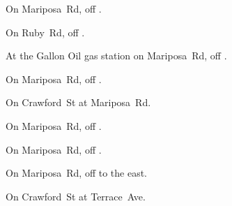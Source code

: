 
\begin{LocationList}

On Mariposa~Rd, off  .

On Ruby~Rd, off  .

At the Gallon Oil gas station on Mariposa~Rd, off  .

On Mariposa~Rd, off  .

On Crawford~St at Mariposa~Rd.

On Mariposa~Rd, off  .

On Mariposa~Rd, off  .

On Mariposa~Rd, off   to the east.

\Location{\TruckStop \Gas \Rest}
On Crawford~St at Terrace~Ave.

\end{LocationList}
